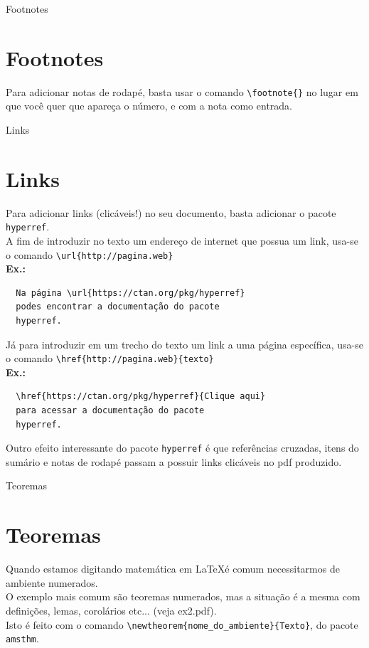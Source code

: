 \documentclass[12pt]{beamer}
\begin{document}
\begin{frame}[fragile]{Footnotes}
  \section{Footnotes}

  Para adicionar notas de rodapé, basta usar o comando \verb+\footnote{}+ no lugar em que você quer que apareça o número, e com a nota como entrada.
\end{frame}

\begin{frame}[fragile]{Links}
  \section{Links}
  Para adicionar links (clicáveis!) no seu documento, basta adicionar o pacote \verb+hyperref+.\\

  A fim de introduzir no texto um endereço de internet que possua um link, usa-se o comando \verb+\url{http://pagina.web}+\\
  \medskip
  \textbf{Ex.:}
  \begin{verbatim}
  Na página \url{https://ctan.org/pkg/hyperref}
  podes encontrar a documentação do pacote
  hyperref.
  \end{verbatim}
\end{frame}

\begin{frame}[fragile]
  Já para introduzir em um trecho do texto um link a uma página específica, usa-se o comando \verb+\href{http://pagina.web}{texto}+\\
  \medskip
  \textbf{Ex.:}
  \begin{verbatim}
  \href{https://ctan.org/pkg/hyperref}{Clique aqui}
  para acessar a documentação do pacote
  hyperref.
  \end{verbatim}
  Outro efeito interessante do pacote \verb+hyperref+ é que referências cruzadas, itens do sumário e notas de rodapé passam a possuir links clicáveis no pdf produzido.
\end{frame}

\begin{frame}[fragile]{Teoremas}
  \section{Teoremas}
  Quando estamos digitando matemática em \LaTeX é comum necessitarmos de ambiente numerados. \\
  \medskip
  O exemplo mais comum são teoremas numerados, mas a situação é a mesma com definições, lemas, corolários etc... (veja ex2.pdf).\\
  \medskip
  Isto é feito com o comando \verb+\newtheorem{nome_do_ambiente}{Texto}+, do pacote \verb+amsthm+.
\end{frame}
\end{document}
